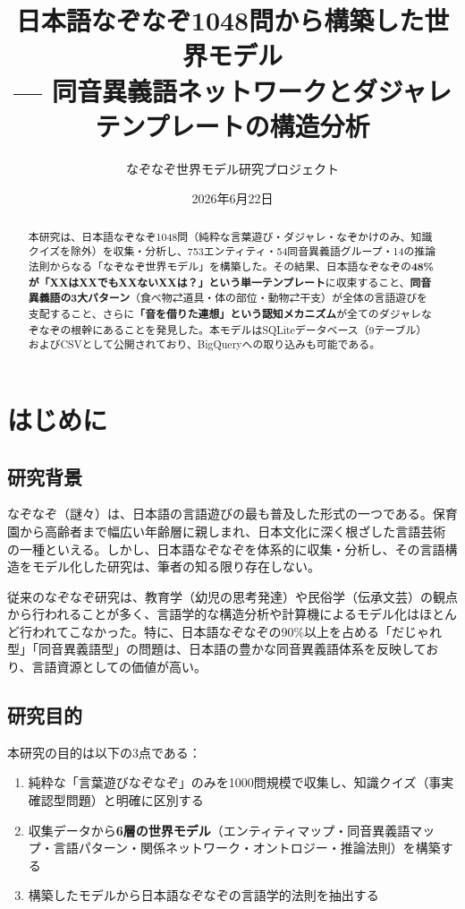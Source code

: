 \documentclass[a4paper,11pt]{ltjsarticle}
\title{日本語なぞなぞ1048問から構築した世界モデル\\
--- 同音異義語ネットワークとダジャレテンプレートの構造分析}
\author{なぞなぞ世界モデル研究プロジェクト}
\date{2026年6月22日}
\begin{document}
\maketitle

\begin{abstract}
本研究は、日本語なぞなぞ1048問（純粋な言葉遊び・ダジャレ・なぞかけのみ、知識クイズを除外）を収集・分析し、753エンティティ・54同音異義語グループ・14の推論法則からなる「なぞなぞ世界モデル」を構築した。その結果、日本語なぞなぞの\textbf{48\%が「XXはXXでもXXないXXは？」という単一テンプレート}に収束すること、\textbf{同音異義語の3大パターン}（食べ物⇄道具・体の部位・動物⇄干支）が全体の言語遊びを支配すること、さらに\textbf{「音を借りた連想」という認知メカニズム}が全てのダジャレなぞなぞの根幹にあることを発見した。本モデルはSQLiteデータベース（9テーブル）およびCSVとして公開されており、BigQueryへの取り込みも可能である。
\end{abstract}

\section{はじめに}

\subsection{研究背景}

なぞなぞ（謎々）は、日本語の言語遊びの最も普及した形式の一つである。保育園から高齢者まで幅広い年齢層に親しまれ、日本文化に深く根ざした言語芸術の一種といえる。しかし、日本語なぞなぞを体系的に収集・分析し、その言語構造をモデル化した研究は、筆者の知る限り存在しない。

従来のなぞなぞ研究は、教育学（幼児の思考発達）や民俗学（伝承文芸）の観点から行われることが多く、言語学的な構造分析や計算機によるモデル化はほとんど行われてこなかった。特に、日本語なぞなぞの90\%以上を占める「だじゃれ型」「同音異義語型」の問題は、日本語の豊かな同音異義語体系を反映しており、言語資源としての価値が高い。

\subsection{研究目的}

本研究の目的は以下の3点である：
\begin{enumerate}
    \item 純粋な「言葉遊びなぞなぞ」のみを1000問規模で収集し、知識クイズ（事実確認型問題）と明確に区別する
    \item 収集データから\textbf{6層の世界モデル}（エンティティマップ・同音異義語マップ・言語パターン・関係ネットワーク・オントロジー・推論法則）を構築する
    \item 構築したモデルから日本語なぞなぞの言語学的法則を抽出する
\end{enumerate}
\end{document}

